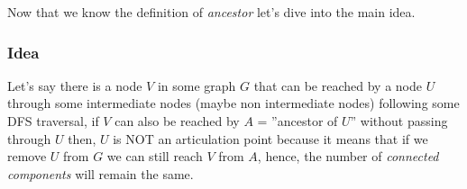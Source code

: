 \documentclass[twoside]{book}
\begin{document}
Now that we know the definition of \textit{ancestor} let's dive into the main idea.


\subsubsection*{Idea}

Let's say there is a node $V$ in some graph $G$ that can be reached by a node $U$ through some
intermediate nodes (maybe non intermediate nodes) following some DFS traversal, if $V$ can also be
reached by $A$ = ''ancestor of $U$'' without passing through $U$ then, $U$ is NOT an articulation point
because it means that if we remove $U$ from $G$ we can still reach $V$ from $A$, hence, the number of
\textit{connected components} will remain the same.
\begin{multicols*}{2}
\end{multicols*}
\end{document}
